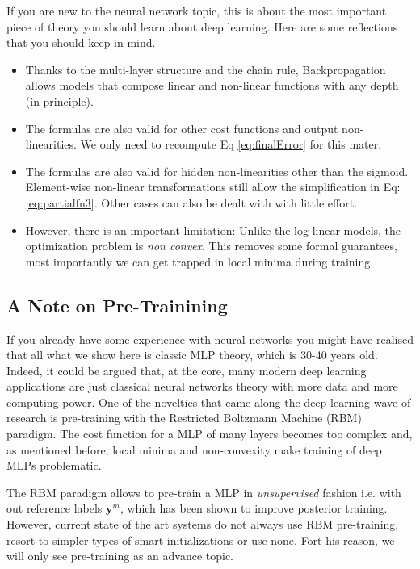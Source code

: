 If you are new to the neural network topic, this is about the most important piece of theory you should learn about deep learning. Here are some reflections that you should keep in mind.

\begin{itemize}
\item Thanks to the multi-layer structure and the chain rule, Backpropagation allows models that compose linear and non-linear functions with any depth (in principle\footnotemark). 
\item The formulas are also valid for other cost functions and output non-linearities. We only need to recompute Eq \ref{eq:finalError} for this mater.  
\item The formulas are also valid for hidden non-linearities other than the sigmoid. Element-wise non-linear transformations still allow the simplification in Eq: \ref{eq:partialfn3}. Other cases can also be dealt with with little effort.
\item However, there is an important limitation: Unlike the log-linear models, the optimization problem is \textit{non convex}. This removes some formal guarantees, most importantly we can get trapped in local minima during training.
\end{itemize}


\subsection{A Note on Pre-Trainining}

If you already have some experience with neural networks you might have realised that all what we show here is classic MLP theory, which is 30-40 years old. Indeed, it could be argued that, at the core, many modern deep learning applications are just classical neural networks theory with more data and more computing power. One of the novelties that came along the deep learning wave of research is pre-training with the Restricted Boltzmann Machine (RBM) paradigm. The cost function for a MLP of many layers becomes too complex and, as mentioned before, local minima and non-convexity make training of deep MLPs problematic. 

The RBM paradigm allows to pre-train a MLP in \textit{unsupervised} fashion i.e. with out reference labels $\mathbf{y}^m$, which has been shown to improve posterior training. However, current state of the art systems do not always use RBM pre-training, resort to simpler types of smart-initializations or use none. Fort his reason, we will only see pre-training as an advance topic.  

